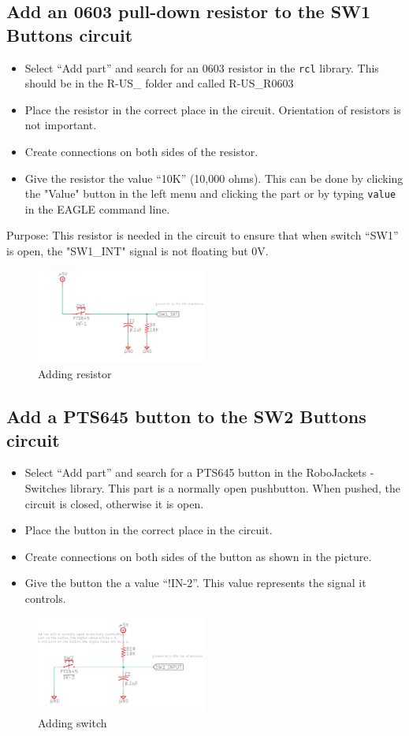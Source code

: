 \documentclass{article}
\begin{document}
\subsection{Add an 0603 pull-down resistor to the SW1 Buttons circuit}
\begin{itemize}
    \item Select “Add part” and search for an 0603 resistor in the \texttt{rcl} library. This should be in the R-US\_ folder and called R-US\_R0603
    \item  Place the resistor in the correct place in the circuit. Orientation of resistors is not important.
    \item Create connections on both sides of the resistor.
    \item Give the resistor the value “10K” (10,000 ohms). This can be done by clicking the "Value" button in the left menu and clicking the part or by typing \texttt{value} in the EAGLE command line. 
\end{itemize}
Purpose: This resistor is needed in the circuit to ensure that when switch “SW1” is open, the "SW1\_INT" signal is not floating but 0V.
\begin{figure}[ht]
	\center
	\includegraphics[width=0.5\textwidth, keepaspectratio]{images/5.1.png}
	\caption{Adding resistor}
	\label{fig:5.1}
\end{figure}
\subsection{Add a PTS645 button to the SW2 Buttons circuit}
\begin{itemize}
    \item  Select “Add part” and search for a PTS645 button in the RoboJackets - Switches library. This part is a normally open pushbutton. When pushed, the circuit is closed, otherwise it is open.
    \item Place the button in the correct place in the circuit.
    \item Create connections on both sides of the button as shown in the picture.
    \item Give the button the a value “!IN-2”. This value represents the signal it controls.
\end{itemize}
\begin{figure}[ht]
	\center
	\includegraphics[width=0.5\textwidth, keepaspectratio]{images/5.2.png}
	\caption{Adding switch}
	\label{fig:5.2}
\end{figure}
\end{document}
